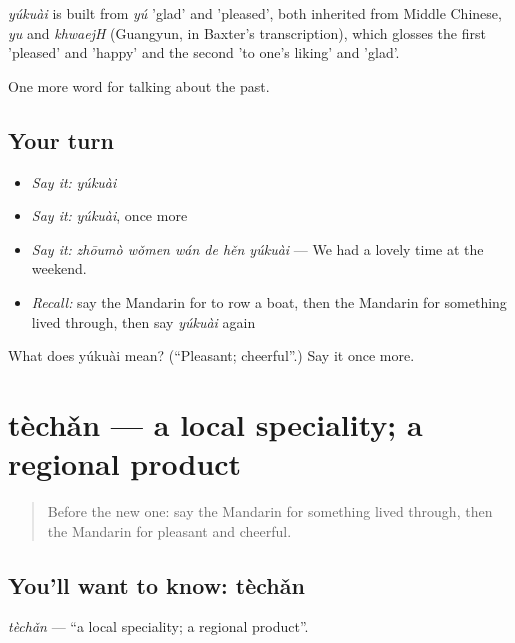 \begin{cousinweb}
\emph{yúkuài} is built from \emph{yú} 'glad' and  'pleased', both inherited from Middle Chinese, \emph{yu} and \emph{khwaejH} (Guangyun, in Baxter's transcription), which glosses the first 'pleased' and 'happy' and the second 'to one's liking' and 'glad'.
\end{cousinweb}

\begin{grammarlens}[title={What you've built}]
One more word for talking about the past.
\end{grammarlens}

\subsection*{Your turn}
\begin{itemize}
\raggedright
  \item \emph{Say it:} \emph{yúkuài}
  \item \emph{Say it:} \emph{yúkuài}, once more
  \item \emph{Say it:} \emph{zhōumò wǒmen wán de hěn yúkuài} — We had a lovely time at the weekend.
  \item \emph{Recall:} say the Mandarin for to row a boat, then the Mandarin for something lived through, then say \emph{yúkuài} again
\end{itemize}

\begin{tcolorbox}[breakable,colback=teal!4,colframe=teal!35!black,title={Before you move on}]
What does yúkuài mean? (\textquotedblleft{}Pleasant; cheerful\textquotedblright{}.) Say it once more.
\end{tcolorbox}
\section[tèchǎn]{tèchǎn — a local speciality; a regional product}

\label{lesson:ZH-C247-techan}



\begin{quote}
Before the new one: say the Mandarin for something lived through, then the Mandarin for pleasant and cheerful.
\end{quote}

\subsection*{You'll want to know: tèchǎn}
\emph{tèchǎn} — \textquotedblleft{}a local speciality; a regional product\textquotedblright{}.


